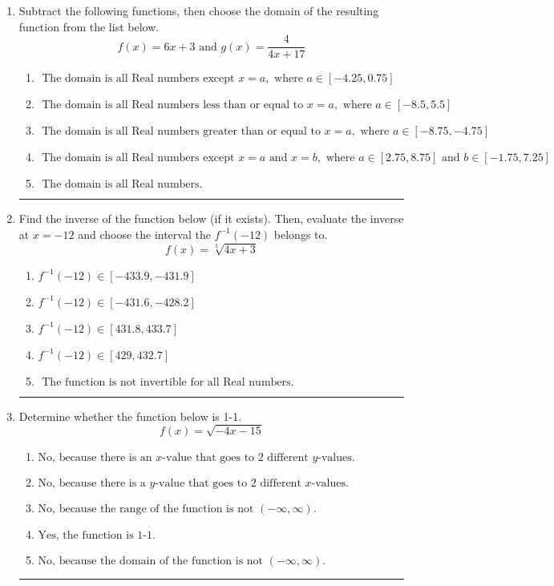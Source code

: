 \documentclass[14pt]{extbook}
\newcommand{\litem}[1]{\item#1\hspace*{-1cm}\rule{\textwidth}{0.4pt}}
\begin{document}
\begin{enumerate}
\litem{
Subtract the following functions, then choose the domain of the resulting function from the list below.\[ f(x) = 6x + 3 \text{ and } g(x) = \frac{4}{4x+17} \]\begin{enumerate}[label=\Alph*.]
\item \( \text{ The domain is all Real numbers except } x = a, \text{ where } a \in [-4.25, 0.75] \)
\item \( \text{ The domain is all Real numbers less than or equal to } x = a, \text{ where } a \in [-8.5, 5.5] \)
\item \( \text{ The domain is all Real numbers greater than or equal to } x = a, \text{ where } a \in [-8.75, -4.75] \)
\item \( \text{ The domain is all Real numbers except } x = a \text{ and } x = b, \text{ where } a \in [2.75, 8.75] \text{ and } b \in [-1.75, 7.25] \)
\item \( \text{ The domain is all Real numbers. } \)

\end{enumerate} }
\litem{
Find the inverse of the function below (if it exists). Then, evaluate the inverse at $x = -12$ and choose the interval the $f^{-1}(-12)$ belongs to.\[ f(x) = \sqrt[3]{4 x + 3} \]\begin{enumerate}[label=\Alph*.]
\item \( f^{-1}(-12) \in [-433.9, -431.9] \)
\item \( f^{-1}(-12) \in [-431.6, -428.2] \)
\item \( f^{-1}(-12) \in [431.8, 433.7] \)
\item \( f^{-1}(-12) \in [429, 432.7] \)
\item \( \text{ The function is not invertible for all Real numbers. } \)

\end{enumerate} }
\litem{
Determine whether the function below is 1-1.\[ f(x) = \sqrt{-4 x - 15} \]\begin{enumerate}[label=\Alph*.]
\item \( \text{No, because there is an $x$-value that goes to 2 different $y$-values.} \)
\item \( \text{No, because there is a $y$-value that goes to 2 different $x$-values.} \)
\item \( \text{No, because the range of the function is not $(-\infty, \infty)$.} \)
\item \( \text{Yes, the function is 1-1.} \)
\item \( \text{No, because the domain of the function is not $(-\infty, \infty)$.} \)


\end{enumerate}}
\end{enumerate}
\end{document}
